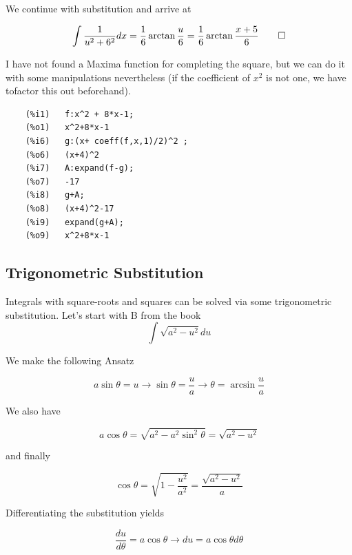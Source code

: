 We continue with substitution and arrive at

\begin{equation*}
    \int \frac{1}{u^2 + 6^2} dx = \frac{1}{6} \arctan \frac{u}{6} = \frac{1}{6} \arctan \frac{x+5}{6} \qed
\end{equation*}

I have not found a Maxima function for completing the square, but we can do it with some manipulations nevertheless (if the coefficient of $x^2$ is not one, we have tofactor this out beforehand).

\begin{verbatim}
    (%i1)	f:x^2 + 8*x-1;
    (%o1)	x^2+8*x-1
    (%i6)	g:(x+ coeff(f,x,1)/2)^2 ;
    (%o6)	(x+4)^2
    (%i7)	A:expand(f-g);
    (%o7)	-17
    (%i8)	g+A;
    (%o8)	(x+4)^2-17
    (%i9)	expand(g+A);
    (%o9)	x^2+8*x-1
\end{verbatim}


\subsection{Trigonometric Substitution}

Integrals with square-roots and squares can be solved via some trigonometric substitution. Let's start with B from the book
\begin{equation*}
    \int \sqrt{a^2 - u^2} du
\end{equation*}

We make the following Ansatz

\begin{equation*}
    a \sin \theta = u \rightarrow \sin \theta = \frac{u}{a} \rightarrow \theta = \arcsin \frac{u}{a}
\end{equation*}

We also have

\begin{equation*}
    a \cos \theta = \sqrt{a^2 - a^2 \sin^2 \theta} = \sqrt{a^2 - u^2}
\end{equation*}

and finally

\begin{equation*}
    \cos \theta = \sqrt{1 - \frac{u^2}{a^2}} = \frac{\sqrt{a^2 - u^2}}{a}
\end{equation*}

Differentiating the substitution yields

\begin{equation*}
    \frac{du}{d \theta} = a \cos \theta \rightarrow du = a \cos \theta d\theta
\end{equation*}

